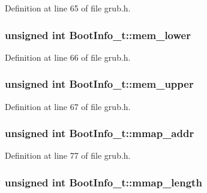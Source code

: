 Definition at line 65 of file grub.\+h.

\hypertarget{structBootInfo__t_a4b144c9db5fe2c5a9d72522068d65138}{
\subsubsection[{mem\+\_\+lower}]{\setlength{\rightskip}{0pt plus 5cm}unsigned int Boot\+Info\+\_\+t\+::mem\+\_\+lower}}\label{structBootInfo__t_a4b144c9db5fe2c5a9d72522068d65138}


Definition at line 66 of file grub.\+h.

\hypertarget{structBootInfo__t_ab20281f521d626a49714e06b62291be9}{
\subsubsection[{mem\+\_\+upper}]{\setlength{\rightskip}{0pt plus 5cm}unsigned int Boot\+Info\+\_\+t\+::mem\+\_\+upper}}\label{structBootInfo__t_ab20281f521d626a49714e06b62291be9}


Definition at line 67 of file grub.\+h.

\hypertarget{structBootInfo__t_a904e8344d4c4ef9a650305409b933b17}{
\subsubsection[{mmap\+\_\+addr}]{\setlength{\rightskip}{0pt plus 5cm}unsigned int Boot\+Info\+\_\+t\+::mmap\+\_\+addr}}\label{structBootInfo__t_a904e8344d4c4ef9a650305409b933b17}


Definition at line 77 of file grub.\+h.

\hypertarget{structBootInfo__t_ac44eb8289f5f6fbbca78dc24e5052be7}{
\subsubsection[{mmap\+\_\+length}]{\setlength{\rightskip}{0pt plus 5cm}unsigned int Boot\+Info\+\_\+t\+::mmap\+\_\+length}}\label{structBootInfo__t_ac44eb8289f5f6fbbca78dc24e5052be7}


